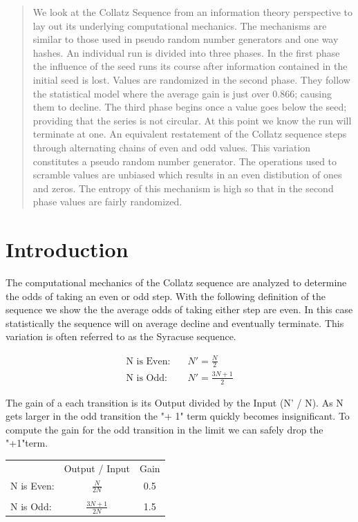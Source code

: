 \documentclass[preprint]{sigplanconf}
\begin{document}
\begin{abstract}
    We look at the Collatz Sequence from an information theory perspective to lay out its underlying computational mechanics. The mechanisms are similar to those used in pseudo random number generators and one way hashes.
    An individual run is divided into three phases.  In the first phase the influence of the seed runs its course after information contained in the initial seed is lost.  Values are randomized in the second phase.  They follow the statistical model where the average gain is just over 0.866; causing them to decline.  The third phase begins once a value goes below the seed; providing that the series is not circular.  At this point we know the run will terminate at one.
    An equivalent restatement of the Collatz sequence steps through alternating chains of even and odd values.  This variation constitutes a pseudo random number generator.  The operations used to scramble values are unbiased which results in an even distibution of ones and zeros.  The entropy of this mechanism is high so that in the second phase values are fairly randomized.
\end{abstract}

\section{Introduction}


The computational mechanics of the Collatz sequence are analyzed to determine the odds of taking an even or odd step. With the following definition of the sequence we show the the average odds of taking either step are even. In this case statistically the sequence will on average decline and eventually terminate. This variation is often referred to as the Syracuse sequence.

\begin{align*}
    \text{N is Even:} & \quad N' = \frac{N}{2}      \\
    \text{N is Odd:}  & \quad N' = \frac{3N + 1}{2}
\end{align*}

The gain of a each transition is its Output divided by the Input (N' / N). As N gets larger in the odd transition the "+ 1" term quickly becomes insignificant. To compute the gain for the odd transition in the limit we can safely drop the "+1"term.

\begin{center}
    \begin{tabular}{l c c}
                   & Output / Input      & Gain \\
        N is Even: & $\frac{N}{2N}$      & 0.5  \\
                   &                     &      \\
        N is Odd:  & $\frac{3N + 1}{2N}$ & 1.5
    \end{tabular}
\end{center}
\end{document}

